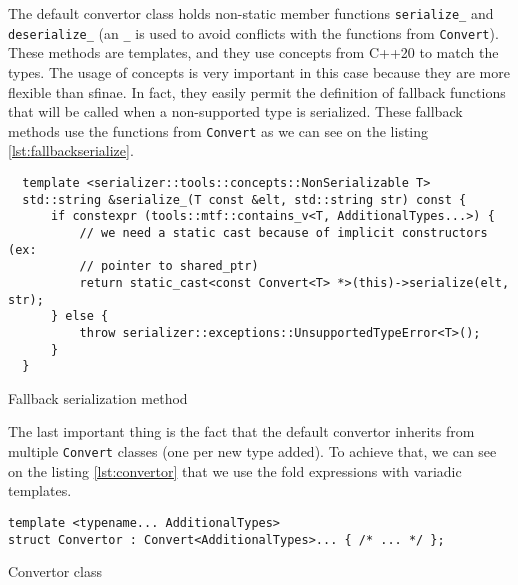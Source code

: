 The default convertor class holds non-static member functions
\texttt{serialize\_} and \texttt{deserialize\_} (an \texttt{\_} is used to avoid
conflicts with the functions from \texttt{Convert}). These methods are
templates, and they use concepts from C++20 to match the types. The usage of
concepts is very important in this case because they are more flexible than
\gls{sfinae}. In fact, they easily permit the definition of fallback functions
that will be called when a non-supported type is serialized. These fallback
methods use the functions from \texttt{Convert} as we can see on the listing
\ref{lst:fallbackserialize}.

\begin{listing}[ht!]
\begin{verbatim}
  template <serializer::tools::concepts::NonSerializable T>
  std::string &serialize_(T const &elt, std::string str) const {
      if constexpr (tools::mtf::contains_v<T, AdditionalTypes...>) {
          // we need a static cast because of implicit constructors (ex:
          // pointer to shared_ptr)
          return static_cast<const Convert<T> *>(this)->serialize(elt, str);
      } else {
          throw serializer::exceptions::UnsupportedTypeError<T>();
      }
  }
\end{verbatim}
\caption{Fallback serialization method}
\label{lstd:fallbackserialize}
\end{listing}

The last important thing is the fact that the default convertor inherits from
multiple \texttt{Convert} classes (one per new type added). To achieve that, we
can see on the listing \ref{lst:convertor} that we use the fold expressions with
variadic templates.

\begin{listing}[ht!]
\begin{verbatim}
template <typename... AdditionalTypes>
struct Convertor : Convert<AdditionalTypes>... { /* ... */ };
\end{verbatim}
\caption{Convertor class}
\label{lst:convertor}
\end{listing}


